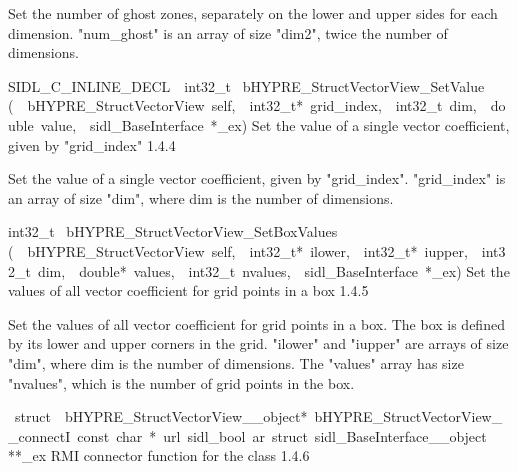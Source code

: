 \documentclass{article}
\begin{document}
\begin{cxxentry}
\begin{cxxentry}
\begin{cxxfunction}
\begin{cxxdoc}
Set the number of ghost zones, separately on the lower and upper sides
for each dimension.
"num\_ghost" is an array of size "dim2", twice the number of dimensions. 
\end{cxxdoc}
\end{cxxfunction}
\begin{cxxfunction}
{SIDL\_C\_INLINE\_DECL\ \ int32\_t\ }
        {bHYPRE\_StructVectorView\_SetValue}
        {(\ \ bHYPRE\_StructVectorView\ self,\ \ int32\_t*\ grid\_index,\ \ int32\_t\ dim,\ \ double\ value,\ \ sidl\_BaseInterface\ *\_ex)}
        {
Set the value of a single vector coefficient, given by "grid\_index"}
        {1.4.4}
\begin{cxxdoc}

Set the value of a single vector coefficient, given by "grid\_index".
"grid\_index" is an array of size "dim", where dim is the number
of dimensions. 
\end{cxxdoc}
\end{cxxfunction}
\begin{cxxfunction}
{int32\_t\ }
        {bHYPRE\_StructVectorView\_SetBoxValues}
        {(\ \ bHYPRE\_StructVectorView\ self,\ \ int32\_t*\ ilower,\ \ int32\_t*\ iupper,\ \ int32\_t\ dim,\ \ double*\ values,\ \ int32\_t\ nvalues,\ \ sidl\_BaseInterface\ *\_ex)}
        {
Set the values of all vector coefficient for grid points in a box}
        {1.4.5}
\begin{cxxdoc}

Set the values of all vector coefficient for grid points in a box.
The box is defined by its lower and upper corners in the grid.
"ilower" and "iupper" are arrays of size "dim", where dim is the
number of dimensions.  The "values" array has size "nvalues", which
is the number of grid points in the box. 
\end{cxxdoc}
\end{cxxfunction}
\begin{cxxvariable}
{\ struct\ \ bHYPRE\_StructVectorView\_\_object*\ bHYPRE\_StructVectorView\_\_connectI\ const\ char\ *\ url\ sidl\_bool\ ar\ struct\ sidl\_BaseInterface\_\_object}
        {**\_ex}
        {}
        {
RMI connector function for the class}
        {1.4.6}
\begin{cxxdoc}


\end{cxxdoc}
\end{cxxvariable}
\end{cxxentry}
\end{cxxentry}
\end{document}
